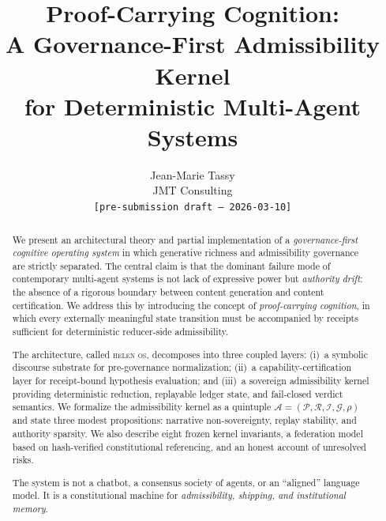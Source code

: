 \documentclass[11pt,a4paper]{article}
\theoremstyle{plain}
\theoremstyle{definition}
\theoremstyle{remark}
\newcommand{\Prop}{\mathcal{P}}
\newcommand{\Rec}{\mathcal{R}}
\newcommand{\Inv}{\mathcal{I}}
\newcommand{\Gate}{\mathcal{G}}
\newcommand{\red}{\rho}
\newcommand{\admsys}{\mathcal{A}}
\begin{document}
\title{%
  \textbf{Proof-Carrying Cognition:}\\
  A Governance-First Admissibility Kernel\\
  for Deterministic Multi-Agent Systems%
}

\author{%
  Jean-Marie Tassy\\
  JMT Consulting\\
  \texttt{[pre-submission draft — 2026-03-10]}
}

\date{}
\maketitle

\begin{abstract}
We present an architectural theory and partial implementation of a
\emph{governance-first cognitive operating system} in which generative richness and
admissibility governance are strictly separated.
The central claim is that the dominant failure mode of contemporary
multi-agent systems is not lack of expressive power but \emph{authority drift}:
the absence of a rigorous boundary between content generation and content certification.
We address this by introducing the concept of \emph{proof-carrying cognition},
in which every externally meaningful state transition must be accompanied by
receipts sufficient for deterministic reducer-side admissibility.

The architecture, called \textsc{helen os}, decomposes into three coupled layers:
(i)~a symbolic discourse substrate for pre-governance normalization;
(ii)~a capability-certification layer for receipt-bound hypothesis evaluation;
and (iii)~a sovereign admissibility kernel providing deterministic reduction,
replayable ledger state, and fail-closed verdict semantics.
We formalize the admissibility kernel as a quintuple
$\admsys = (\Prop, \Rec, \Inv, \Gate, \red)$
and state three modest propositions: narrative non-sovereignty,
replay stability, and authority sparsity.
We also describe eight frozen kernel invariants, a federation model based on
hash-verified constitutional referencing, and an honest account of unresolved risks.

The system is not a chatbot, a consensus society of agents, or an
``aligned'' language model.
It is a constitutional machine for \emph{admissibility, shipping, and institutional memory}.
\end{abstract}

\tableofcontents
\newpage
\end{document}
